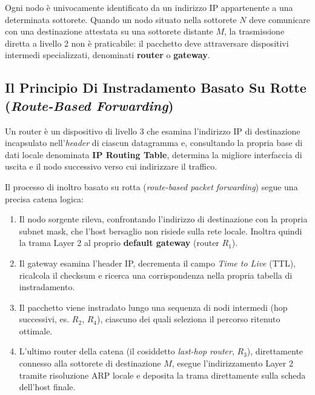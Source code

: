 \documentclass[11pt, a4paper]{article}
\begin{document}

Ogni nodo è univocamente identificato da un indirizzo IP appartenente a una determinata sottorete. Quando un nodo situato nella sottorete $N$ deve comunicare con una destinazione attestata su una sottorete distante $M$, la trasmissione diretta a livello 2 non è praticabile: il pacchetto deve attraversare dispositivi intermedi specializzati, denominati \textbf{router} o \textbf{gateway}.

\subsection{Il Principio Di Instradamento Basato Su Rotte (\emph{Route-Based Forwarding})}

Un router è un dispositivo di livello 3 che esamina l'indirizzo IP di destinazione incapsulato nell'\emph{header} di ciascun datagramma e, consultando la propria base di dati locale denominata \textbf{IP Routing Table}, determina la migliore interfaccia di uscita e il nodo successivo verso cui indirizzare il traffico.


Il processo di inoltro basato su rotta (\emph{route-based packet forwarding}) segue una precisa catena logica:
\begin{enumerate}[noitemsep]
    \item Il nodo sorgente rileva, confrontando l'indirizzo di destinazione con la propria subnet mask, che l'host bersaglio non risiede sulla rete locale. Inoltra quindi la trama Layer 2 al proprio \textbf{default gateway} (router $R_1$).
    \item Il gateway esamina l'header IP, decrementa il campo \emph{Time to Live} (TTL), ricalcola il checksum e ricerca una corrispondenza nella propria tabella di instradamento.
    \item Il pacchetto viene instradato lungo una sequenza di nodi intermedi (hop successivi, es. $R_2$, $R_4$), ciascuno dei quali seleziona il percorso ritenuto ottimale.
    \item L'ultimo router della catena (il cosiddetto \emph{last-hop router}, $R_3$), direttamente connesso alla sottorete di destinazione $M$, esegue l'indirizzamento Layer 2 tramite risoluzione ARP locale e deposita la trama direttamente sulla scheda dell'host finale.
\end{enumerate}
\end{document}

